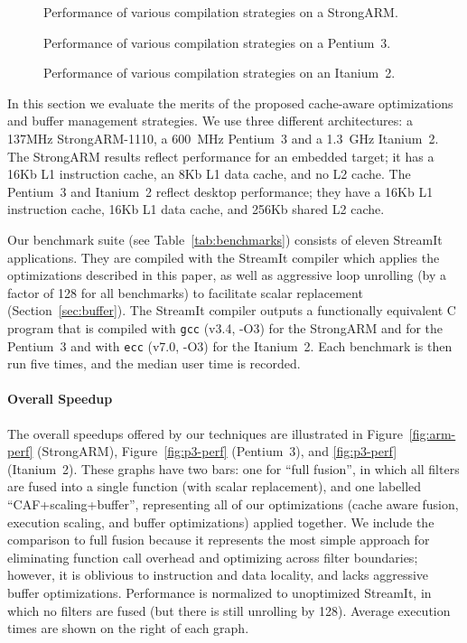 \begin{figure}
\begin{minipage}{3.35in}
\caption{Performance of various compilation strategies on a StrongARM.\protect\label{fig:arm-perf2}}

\caption{Performance of various compilation strategies on a Pentium~3.\protect\label{fig:p3-perf2}}

\caption{Performance of various compilation strategies on an Itanium~2.\protect\label{fig:i2-perf2}}
\end{minipage}
\end{figure}

In this section we evaluate the merits of the proposed cache-aware
optimizations and buffer management strategies.  We use three
different architectures: a 137MHz StrongARM-1110, a 600~MHz Pentium~3
and a 1.3~GHz Itanium~2. The StrongARM results reflect performance for
an embedded target; it has a 16Kb L1 instruction cache, an 8Kb L1 data
cache, and no L2 cache.  The Pentium~3 and Itanium~2 reflect desktop
performance; they have a 16Kb L1 instruction cache, 16Kb L1 data
cache, and 256Kb shared L2 cache.

Our benchmark suite (see Table~\ref{tab:benchmarks}) consists of
eleven StreamIt applications. They are compiled with the StreamIt
compiler which applies the optimizations described in this paper, as
well as aggressive loop unrolling (by a factor of 128 for all
benchmarks) to facilitate scalar replacement
(Section~\ref{sec:buffer}).  The StreamIt compiler outputs a
functionally equivalent C program that is compiled with \texttt{gcc}
(v3.4, -O3) for the StrongARM and for the Pentium~3 and with
\texttt{ecc} (v7.0, -O3) for the Itanium~2.  Each benchmark is then
run five times, and the median user time is recorded.

\paragraph*{Overall Speedup} 
The overall speedups offered by our techniques are illustrated in
Figure~\ref{fig:arm-perf} (StrongARM), Figure~\ref{fig:p3-perf}
(Pentium~3), and \ref{fig:p3-perf} (Itanium~2).  These graphs have two
bars: one for ``full fusion'', in which all filters are fused into a
single function (with scalar replacement), and one labelled
``CAF+scaling+buffer'', representing all of our optimizations (cache
aware fusion, execution scaling, and buffer optimizations) applied
together.  We include the comparison to full fusion because it
represents the most simple approach for eliminating function call
overhead and optimizing across filter boundaries; however, it is
oblivious to instruction and data locality, and lacks aggressive
buffer optimizations.  Performance is normalized to unoptimized
StreamIt, in which no filters are fused (but there is still unrolling
by 128).  Average execution times are shown on the right of each
graph.

